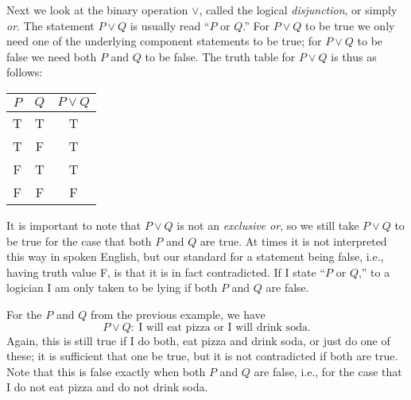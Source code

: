 Next we look at the binary operation $\vee$, called 
the logical {\it disjunction}, or simply {\it or}.
The statement $P\vee Q$ is usually read ``$P$ or $Q$.''
For $P\vee Q$ to be true we only need one of the
underlying component statements to be true; for $P\vee Q$ to
be false we need both $P$ and $Q$ to be false.
The truth table for $P\vee Q$ is thus as follows:


\begin{center}
\medskip

\begin{tabular}{|c|c||c|}\hline
$P$& $Q$&  $P\vee Q$\\
\hline
T&T&T\\
T&F&T\\
F&T&T\\
F&F&F\\\hline \end{tabular}
\medskip
\end{center}

It is important to note that $P\vee Q$ is not an
{\it exclusive or},\footnotemark
{}
so we still take $P\vee Q$ to be true for the case that both
$P$ and $Q$ are true.
At times it is not interpreted this way in spoken English, but
our standard for a statement being false, i.e., having truth
value F, is that it is in fact contradicted.  If
I state ``$P$ or $Q$,'' to a logician I am only taken to be lying if both
$P$ and $Q$ are false.

\bex For the $P$ and $Q$ from the previous
example, we have
$$P\vee Q:\ \text{I will eat pizza or I will drink soda.}$$
Again, this is still true if I do both, eat pizza and drink soda,
or just do one of these;  it is sufficient that one be true,
but it is not contradicted if both are true.  Note that this is
false exactly when both $P$ and $Q$ are false, i.e., for the case that I
do not eat pizza and do not drink soda.
\eex

